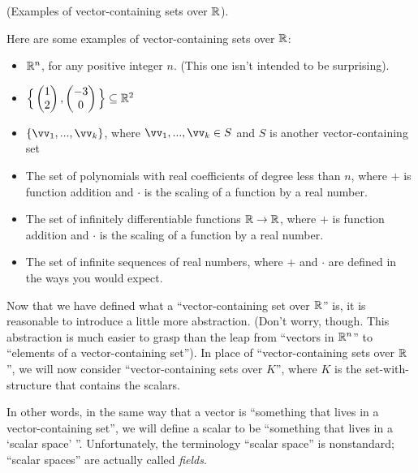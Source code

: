 \begin{remark}
    (Examples of vector-containing sets over $\mathbb{R}$).
    
    Here are some examples of vector-containing sets over $\mathbb{R}$:
    
    \begin{itemize}
        \item $\mathbb{R}^n$, for any positive integer $n$. (This one isn't intended to be surprising).
        \item $\Big\{\begin{pmatrix} 1 \\ 2 \end{pmatrix}, \begin{pmatrix} -3 \\ 0 \end{pmatrix}\Big\} \subseteq \mathbb{R}^2$
        \item $\{\vv_1, ..., \vv_k\}$, where $\vv_1, ..., \vv_k \in S$ and $S$ is another vector-containing set
        \item The set of polynomials with real coefficients of degree less than $n$, where $+$ is function addition and $\cdot$ is the scaling of a function by a real number.
        \item The set of infinitely differentiable functions $\mathbb{R} \rightarrow \mathbb{R}$, where $+$ is function addition and $\cdot$ is the scaling of a function by a real number.
        \item The set of infinite sequences of real numbers, where $+$ and $\cdot$ are defined in the ways you would expect.
    \end{itemize}
\end{remark}

Now that we have defined what a ``vector-containing set over $\mathbb{R}$'' is, it is reasonable to introduce a little more abstraction. (Don't worry, though. This abstraction is much easier to grasp than the leap from ``vectors in $\mathbb{R}^n$'' to ``elements of a vector-containing set''). In place of ``vector-containing sets over $\mathbb{R}$'', we will now consider ``vector-containing sets over $K$'', where $K$ is the set-with-structure that contains the scalars.

In other words, in the same way that a vector is ``something that lives in a vector-containing set'', we will define a scalar to be ``something that lives in a `scalar space' ''.  Unfortunately, the terminology ``scalar space'' is nonstandard;  ``scalar spaces'' are actually called \textit{fields}.

